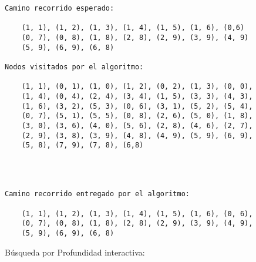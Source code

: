 \begin{lstlisting}[]
Camino recorrido esperado:

    (1, 1), (1, 2), (1, 3), (1, 4), (1, 5), (1, 6), (0,6)
    (0, 7), (0, 8), (1, 8), (2, 8), (2, 9), (3, 9), (4, 9)
    (5, 9), (6, 9), (6, 8)
 
Nodos visitados por el algoritmo:

    (1, 1), (0, 1), (1, 0), (1, 2), (0, 2), (1, 3), (0, 0),
    (1, 4), (0, 4), (2, 4), (3, 4), (1, 5), (3, 3), (4, 3),
    (1, 6), (3, 2), (5, 3), (0, 6), (3, 1), (5, 2), (5, 4),
    (0, 7), (5, 1), (5, 5), (0, 8), (2, 6), (5, 0), (1, 8),
    (3, 0), (3, 6), (4, 0), (5, 6), (2, 8), (4, 6), (2, 7),
    (2, 9), (3, 8), (3, 9), (4, 8), (4, 9), (5, 9), (6, 9),
    (5, 8), (7, 9), (7, 8), (6,8)




Camino recorrido entregado por el algoritmo:
    
    (1, 1), (1, 2), (1, 3), (1, 4), (1, 5), (1, 6), (0, 6),
    (0, 7), (0, 8), (1, 8), (2, 8), (2, 9), (3, 9), (4, 9),
    (5, 9), (6, 9), (6, 8)

\end{lstlisting}

Búsqueda por Profundidad interactiva:\\

